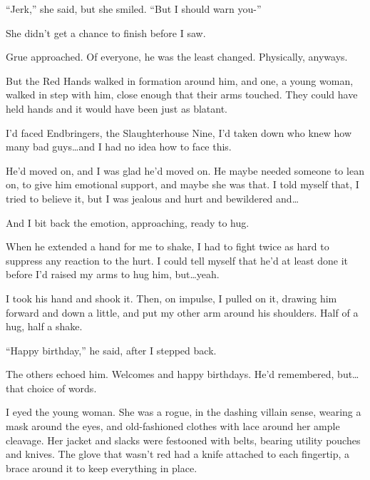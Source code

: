 ``Jerk,'' she said, but she smiled.  ``But I should warn you-''



She didn't get a chance to finish before I saw.



Grue approached.  Of everyone, he was the least changed.  Physically, anyways.



But the Red Hands walked in formation around him, and one, a young woman, walked in step with him, close enough that their arms touched.  They could have held hands and it would have been just as blatant.



I'd faced Endbringers, the Slaughterhouse Nine, I'd taken down who knew how many bad guys\ldots and I had no idea how to face this.



He'd moved on, and I was glad he'd moved on.  He maybe needed someone to lean on, to give him emotional support, and maybe she was that.  I told myself that, I tried to believe it, but I was jealous and hurt and bewildered and\ldots



And I bit back the emotion, approaching, ready to hug.



When he extended a hand for me to shake, I had to fight twice as hard to suppress any reaction to the hurt.  I could tell myself that he'd at least done it before I'd raised my arms to hug him, but\ldots yeah.



I took his hand and shook it.  Then, on impulse, I pulled on it, drawing him forward and down a little, and put my other arm around his shoulders.  Half of a hug, half a shake.



``Happy birthday,'' he said, after I stepped back.



The others echoed him.  Welcomes and happy birthdays.  He'd remembered, but\ldots that choice of words.



I eyed the young woman.  She was a rogue, in the dashing villain sense, wearing a mask around the eyes, and old-fashioned clothes with lace around her ample cleavage.  Her jacket and slacks were festooned with belts, bearing utility pouches and knives.  The glove that wasn't red had a knife attached to each fingertip, a brace around it to keep everything in place.



